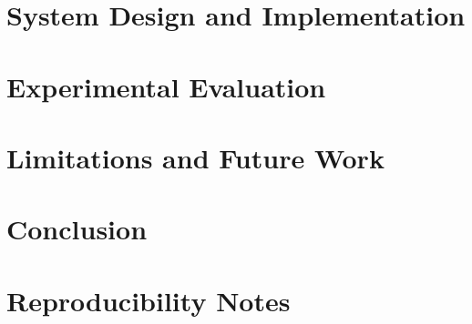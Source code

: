 \documentclass[conference]{IEEEtran}
\begin{document}
\section{System Design and Implementation}


\section{Experimental Evaluation}


\section{Limitations and Future Work}


\section{Conclusion}





\appendix
\section{Reproducibility Notes}

\end{document}
